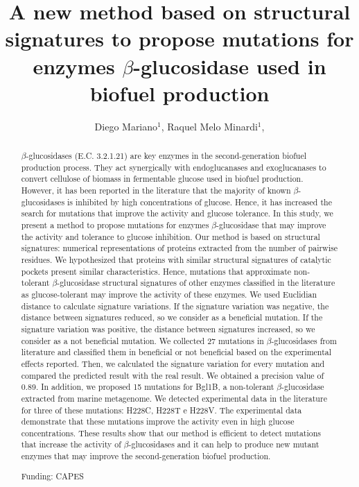 \documentclass[twoside]{article}
\title{\vspace{-15mm}\fontsize{24pt}{10pt}\selectfont\textbf{ A new method based on structural signatures to propose mutations for enzymes $\beta$-glucosidase used in biofuel production }} %
\author{ Diego Mariano$^{1}$, Raquel Melo Minardi$^{1}$, }
\affil{ 1 UFMG

 }
\date{}
\begin{document}
  
  
  \maketitle %
  
  
  \thispagestyle{fancy} %
  
  
  \begin{abstract}
  $\beta$-glucosidases (E.C. 3.2.1.21) are key enzymes in the second-generation biofuel production process. They act synergically with endoglucanases and exoglucanases to convert cellulose of biomass in fermentable glucose used in biofuel production.
However, it has been reported in the literature that the majority of known $\beta$-glucosidases is inhibited by high concentrations of glucose. Hence, it has increased the search for mutations that improve the activity and glucose tolerance. In this study, we present a method to propose mutations for enzymes $\beta$-glucosidase that may improve the activity and tolerance to glucose inhibition. Our method is
based on structural signatures: numerical representations of proteins extracted from the number of pairwise residues. We hypothesized that proteins with similar structural signatures of catalytic pockets present similar characteristics. Hence, mutations that approximate non-tolerant $\beta$-glucosidase structural signatures of other enzymes classified in the literature as glucose-tolerant may improve the activity of these enzymes. We used Euclidian distance to calculate signature variations. If the signature variation was negative, the distance between signatures reduced, so we consider as a beneficial mutation. If the signature variation was positive, the distance between signatures increased, so we consider as a not beneficial mutation. We collected 27 mutations in $\beta$-glucosidases from literature and classified them in beneficial or not beneficial based on the experimental effects reported. Then, we calculated the signature variation for every mutation and compared the predicted result with the real result. We obtained a precision value of 0.89. In addition, we proposed 15 mutations for Bgl1B, a non-tolerant $\beta$-glucosidase extracted from marine metagenome. We detected experimental data in the literature for three of these mutations: H228C, H228T e H228V. The experimental data demonstrate that these mutations improve the activity even in high glucose concentrations. These results show that our method is efficient to detect mutations that increase the activity of $\beta$-glucosidases and it can help to produce new mutant enzymes that may improve the second-generation biofuel production.
  
  Funding: CAPES \\ 
  \end{abstract}
  
\end{document}
